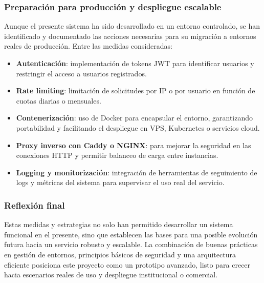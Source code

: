 \subsubsection{Preparación para producción y despliegue escalable}

Aunque el presente sistema ha sido desarrollado en un entorno controlado, se han identificado y documentado las acciones necesarias para su migración a entornos reales de producción. Entre las medidas consideradas:

\begin{itemize}
    \item \textbf{Autenticación}: implementación de tokens JWT para identificar usuarios y restringir el acceso a usuarios registrados.
    \item \textbf{Rate limiting}: limitación de solicitudes por IP o por usuario en función de cuotas diarias o mensuales.
    \item \textbf{Contenerización}: uso de Docker para encapsular el entorno, garantizando portabilidad y facilitando el despliegue en VPS, Kubernetes o servicios cloud.
    \item \textbf{Proxy inverso con Caddy o NGINX}: para mejorar la seguridad en las conexiones HTTP y permitir balanceo de carga entre instancias.
    \item \textbf{Logging y monitorización}: integración de herramientas de seguimiento de logs y métricas del sistema para supervisar el uso real del servicio.
\end{itemize}

\subsubsection{Reflexión final}

Estas medidas y estrategias no solo han permitido desarrollar un sistema funcional en el presente, sino que establecen las bases para una posible evolución futura hacia un servicio robusto y escalable. La combinación de buenas prácticas en gestión de entornos, principios básicos de seguridad y una arquitectura eficiente posiciona este proyecto como un prototipo avanzado, listo para crecer hacia escenarios reales de uso y despliegue institucional o comercial.
